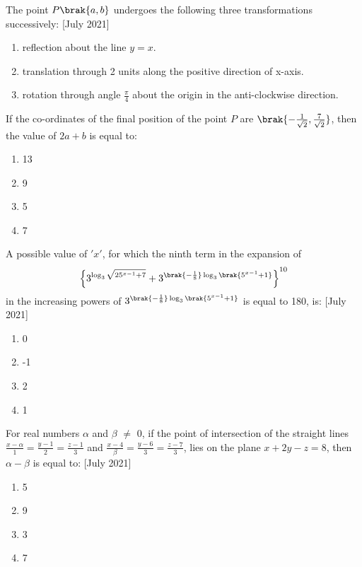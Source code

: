 \iffalse
\title{2021}
\author{AI24BTECH11009}
\section{mcq-single}
\fi
\item The point $P \brak{a, b}$ undergoes the following three transformations successively: \hfill[July 2021]
\begin{enumerate}
    \item reflection about the line $y = x$.
    \item translation through 2 units along the positive direction of x-axis.
    \item rotation through angle $\frac{\pi}{4}$ about the origin in the anti-clockwise direction.
    \end{enumerate}
    If the co-ordinates of the final position of the point $P$ are $\brak{-\frac{1}{\sqrt{2}}, \frac{7}{\sqrt{2}}}$, then the value of $2a + b$ is equal to:
    \begin{enumerate}
        \item 13
        \item 9
        \item 5
        \item 7 \\
    \end{enumerate}
\item A possible value of $'x'$, for which the ninth term in the expansion of 
\begin{align*}
\left\{3^{\log_{3}\sqrt{25^{x-1}+7}}+3^{\brak{-\frac{1}{8}}\log_3\brak{5^{x-1}+1}}\right\}^{10}
\end{align*}
in the increasing powers of $3^{\brak{-\frac{1}{8}}\log_3\brak{5^{x-1}+1}}$ is equal to 180, is: \hfill[July 2021]
\begin{enumerate}
    \item 0
    \item -1
    \item 2
    \item 1 \\
\end{enumerate}
\item For real numbers $\alpha$ and $\beta$ $\neq$ 0, if the point of intersection of the straight lines $\frac{x - \alpha}{1} = \frac{y - 1}{2} = \frac{z - 1}{3}$ and $\frac{x - 4}{\beta} = \frac{y - 6}{3} = \frac{z - 7}{3}$, lies on the plane $x + 2y - z = 8$, then $\alpha - \beta$ is equal to: \hfill[July 2021]
\begin{enumerate}
    \item 5
    \item 9
    \item 3
    \item 7 \\
\end{enumerate}
